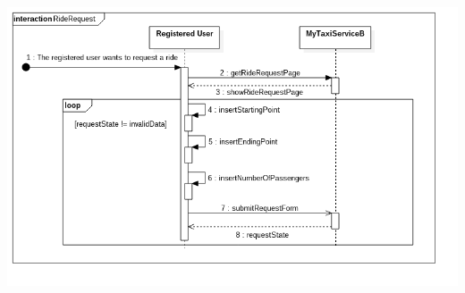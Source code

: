 \documentclass[11pt,titlepage]{article} %
\begin{document}
\begin{enumerate}
\begin{center}
		\includegraphics[scale=0.52]{usecase1.png}
		\end{center}



\end{enumerate}
\end{document}
